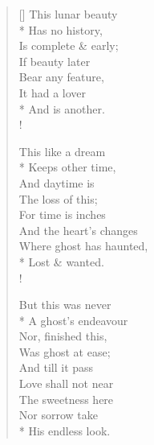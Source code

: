 \documentclass[MAIN]{subfiles}
\begin{document}
\settowidth{\versewidth}{This lunar beauty}
\begin{verse}[\versewidth]
This lunar beauty\\*
Has no history,\\
Is complete \& early;\\
If beauty later\\
Bear any feature,\\
It had a lover\\*
And is another.\\!

This like a dream\\*
Keeps other time,\\
And daytime is\\
The loss of this;\\
For time is inches\\
And the heart's changes\\
Where ghost has haunted,\\*
Lost \& wanted.\\!

But this was never\\*
A ghost's endeavour\\
Nor, finished this,\\
Was ghost at ease;\\
And till it pass\\
Love shall not near\\
The sweetness here\\
Nor sorrow take\\*
His endless look.
\end{verse}
\end{document}
